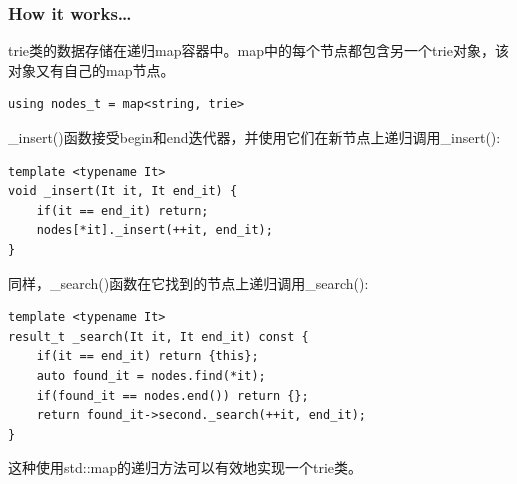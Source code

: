 \subsubsection{How it works…}

trie类的数据存储在递归map容器中。map中的每个节点都包含另一个trie对象，该对象又有自己的map节点。

\begin{lstlisting}[style=styleCXX]
using nodes_t = map<string, trie>
\end{lstlisting}

\_insert()函数接受begin和end迭代器，并使用它们在新节点上递归调用\_insert():

\begin{lstlisting}[style=styleCXX]
template <typename It>
void _insert(It it, It end_it) {
	if(it == end_it) return;
	nodes[*it]._insert(++it, end_it);
}
\end{lstlisting}

同样，\_search()函数在它找到的节点上递归调用\_search():

\begin{lstlisting}[style=styleCXX]
template <typename It>
result_t _search(It it, It end_it) const {
	if(it == end_it) return {this};
	auto found_it = nodes.find(*it);
	if(found_it == nodes.end()) return {};
	return found_it->second._search(++it, end_it);
}
\end{lstlisting}

这种使用std::map的递归方法可以有效地实现一个trie类。






























